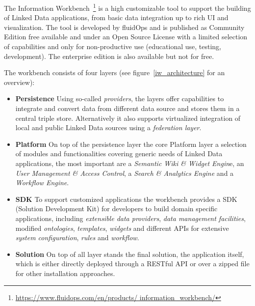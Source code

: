 The Information Workbench~\footnote{\url{https://www.fluidops.com/en/products/
information_workbench/}} is a high customizable tool to support the building of 
Linked Data applications, from basic data integration up to rich UI and 
visualization. The tool is developed by fluidOps and is published as Community 
Edition free available and under an Open Source License with a limited selection 
of capabilities and only for non-productive use (educational use, testing, 
development). The enterprise edition is also available but not for free.

\newpage

The workbench consists of four layers (see figure~\ref{iw_architecture} for an 
overview):~\cite{haase2011information}~\cite{gossenainformation}

\begin{itemize}

\item \textbf{Persistence}
Using so-called \emph{providers}, the layers offer capabilities to integrate and 
convert data from different data source and stores them in a central triple store. 
Alternatively it also supports virtualized integration of local and public Linked 
Data sources using a \emph{federation layer}.

\item \textbf{Platform}
On top of the persistence layer the core Platform layer a selection of modules and 
functionalities covering generic needs of Linked Data applications, the most 
important are a \emph{Semantic Wiki \& Widget Engin}e, an \emph{User Management \& 
Access Control}, a \emph{Search \& Analytics Engine} and a \emph{Workflow Engine}.

\item \textbf{SDK} To support customized applications the workbench provides a SDK 
(Solution Development Kit) for developers to build domain specific applications, 
including \emph{extensible data providers}, \emph{data management facilities}, 
modified \emph{ontologies}, \emph{templates}, \emph{widgets} and different APIs 
for extensive \emph{system configuration}, \emph{rules} and \emph{workflow}.

\item \textbf{Solution}
On top of all layer stands the final solution, the application itself, which is 
either directly deployed through a RESTful API or over a zipped file for other 
installation approaches.

\end{itemize}

